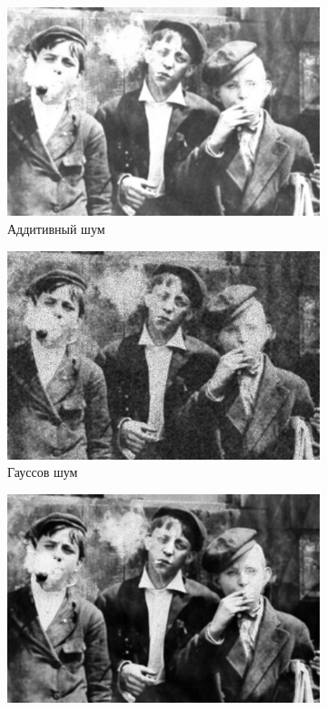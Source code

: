 \begin{figure}[ht!]
\begin{subfigure}[b]{0.5\linewidth}
      \includegraphics[width=0.95\linewidth]{../Wiener_Filter/Wiener_Additive_noise_(k=7).jpg} 
      \caption{Аддитивный шум} 
      \label{weiner_7:c} 
      \vspace{4ex}
    \end{subfigure}%
    \begin{subfigure}[b]{0.5\linewidth}
      \centering
      \includegraphics[width=0.95\linewidth]{../Wiener_Filter/Wiener_Gaussian_noise_(k=7).jpg} 
      \caption{Гауссов шум} 
      \label{weiner_7:d} 
      \vspace{4ex}
    \end{subfigure}
    \begin{subfigure}[b]{0.5\linewidth}
      \centering
      \includegraphics[width=0.95\linewidth]{../Wiener_Filter/Wiener_Poisson_noise_(k=7).jpg} 

\end{subfigure}
\end{figure}
